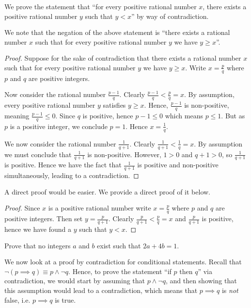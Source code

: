 \begin{example}
    We prove the statement that ``for every positive rational number $x$, there exists a positive rational number $y$ such that $y < x$'' by way of contradiction.

    We note that the negation of the above statement is ``there exists a rational number $x$ such that for every positive rational number $y$ we have $y \geq x$''.
    \begin{proof}
        Suppose for the sake of contradiction that there exists a rational number $x$ such that for every positive rational number $y$ we have $y \geq x$. Write $x = \frac pq$ where $p$ and $q$ are positive integers.

        Now consider the rational number $\frac{p-1}{q}$. Clearly $\frac{p-1}{q} < \frac pq = x$. By assumption, every positive rational number $y$ satisfies $y \geq x$. Hence, $\frac{p-1}{q}$ is non-positive, meaning $\frac{p-1}{q} \leq 0$. Since $q$ is positive, hence $p - 1 \leq 0$ which means $p \leq 1$. But as $p$ is a positive integer, we conclude $p = 1$. Hence $x = \frac 1q$.

        We now consider the rational number $\frac{1}{q+1}$. Clearly $\frac{1}{q+1} < \frac{1}{q} = x$. By assumption we must conclude that $\frac{1}{q+1}$ is non-positive. However, $1 > 0$ and $q + 1 > 0$, so $\frac{1}{q+1}$ is positive. Hence we have the fact that $\frac{1}{q+1}$ is positive and non-positive simultaneously, leading to a contradiction.
    \end{proof}
\end{example}
\begin{remark}
    A direct proof would be easier. We provide a direct proof of it below.
    \begin{proof}
        Since $x$ is a positive rational number write $x = \frac pq$ where $p$ and $q$ are positive integers. Then set $y = \frac{p}{q+1}$. Clearly $\frac{p}{q+1} < \frac{p}{q} = x$ and $\frac{p}{q+1}$ is positive, hence we have found a $y$ such that $y < x$.
    \end{proof}
\end{remark}

\begin{exercise}
    Prove that no integers $a$ and $b$ exist such that $2a + 4b = 1$.
\end{exercise}

We now look at a proof by contradiction for conditional statements. Recall that $\lnot(p \implies q) \equiv p \land \lnot q$. Hence, to prove the statement ``if $p$ then $q$'' via contradiction, we would start by assuming that $p \land \lnot q$, and then showing that this assumption would lead to a contradiction, which means that $p \implies q$ is \textit{not} false, i.e. $p \implies q$ is true.

